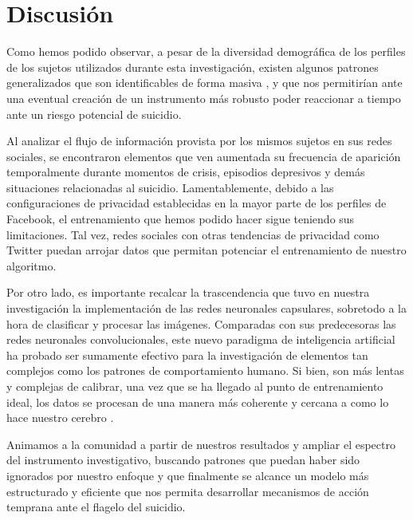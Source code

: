 \documentclass[12pt, donotrepeattitle, jou]{apa6}
\begin{document}
    \section{Discusión}
    Como hemos podido observar, a pesar de la diversidad demográfica de los perfiles de los sujetos utilizados durante esta investigación, existen algunos patrones generalizados que son identificables de forma masiva \parencite{Twitter}, y que nos permitirían ante una eventual creación de un instrumento más robusto poder reaccionar a tiempo ante un riesgo potencial de suicidio.
    
    Al analizar el flujo de información provista por los mismos sujetos en sus redes sociales, se encontraron elementos que ven aumentada su frecuencia de aparición temporalmente durante momentos de crisis, episodios depresivos y demás situaciones relacionadas al suicidio. Lamentablemente, debido a las configuraciones de privacidad establecidas en la mayor parte de los perfiles de Facebook, el entrenamiento que hemos podido hacer sigue teniendo sus limitaciones. Tal vez, redes sociales con otras tendencias de privacidad como Twitter puedan arrojar datos que permitan potenciar el entrenamiento de nuestro algoritmo.
    
    Por otro lado, es importante recalcar la trascendencia que tuvo en nuestra investigación la implementación de las redes neuronales capsulares, sobretodo a la hora de clasificar y procesar las imágenes. Comparadas con sus predecesoras las redes neuronales convolucionales, este nuevo paradigma de inteligencia artificial ha probado ser sumamente efectivo para la investigación de elementos tan complejos como los patrones de comportamiento humano. Si bien, son más lentas y complejas de calibrar, una vez que se ha llegado al punto de entrenamiento ideal, los datos se procesan de una manera más coherente y cercana a como lo hace nuestro cerebro \parencite{Convolutional}.
    
    Animamos a la comunidad a partir de nuestros resultados y ampliar el espectro del instrumento investigativo, buscando patrones que puedan haber sido ignorados por nuestro enfoque y que finalmente se alcance un modelo más estructurado y eficiente que nos permita desarrollar mecanismos de acción temprana ante el flagelo del suicidio.
    \printbibliography
    
\end{document}

